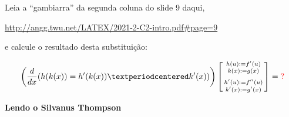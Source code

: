 \documentclass[oneside,12pt]{article}
\begin{document}
Leia a ``gambiarra'' da segunda coluna do slide 9 daqui,

\ssk

{\footnotesize

\url{http://angg.twu.net/LATEX/2021-2-C2-intro.pdf#page=9}

}

\ssk

e calcule o resultado desta substituição:

$$\left(
  \ddx (h(k(x)) = h'(k(x))·k'(x))
  \right)
  \bsm{
    h(u) := f'(u) \\
    k(x) := g(x) \\[5pt]
    h'(u) := f''(u) \\
    k'(x) := g'(x) \\
  }
  = \ColorRed{?}
$$





\newpage

%                                                   

{\bf Lendo o Silvanus Thompson}
\end{document}
